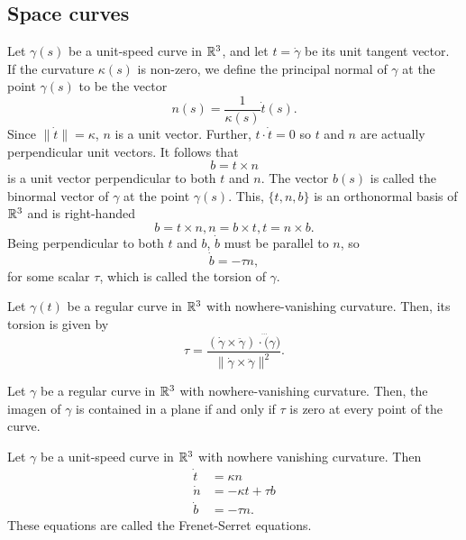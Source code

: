 \subsection{Space curves}

Let $\gamma(s)$ be a unit-speed curve in $\mathbb{R}^3$, and let
$t = \dot{\gamma}$ be its unit tangent vector.
If the curvature $\kappa(s)$ is non-zero, we define the principal normal of $\gamma$
at the point $\gamma(s)$ to be the vector
\[
  n(s) = \frac{1}{\kappa(s)} \dot{t}(s).
\]
Since $\|\dot{t}\| = \kappa$, $n$ is a unit vector.
Further, $t \cdot \dot{t} = 0$ so $t$ and $n$ are actually perpendicular unit vectors.
It follows that
\[
  b = t \times n  
\]
is a unit vector perpendicular to both $t$ and $n$.
The vector $b(s)$ is called the binormal vector of $\gamma$ at the point $\gamma(s)$.
This, $\{t, n, b\}$ is an orthonormal basis of $\mathbb{R}^3$ and is right-handed
\[
  b = t \times n, n = b \times t, t = n \times b.  
\]
Being perpendicular to both $t$ and $b$, $\dot{b}$ must be parallel to $n$, so
\[
  \dot{b} = -\tau n,
\]
for some scalar $\tau$, which is called the torsion of $\gamma$.

\begin{proposition}
  Let $\gamma(t)$ be a regular curve in $\mathbb{R}^3$ with nowhere-vanishing curvature.
  Then, its torsion is given by
  \[
    \tau = \frac{
      (\dot{\gamma} \times \ddot{\gamma}) \cdot \dddot(\gamma)
    }{
      \|\dot{\gamma} \times \ddot{\gamma}\|^2
    }.
  \]
\end{proposition}


\begin{proposition}
  Let $\gamma$ be a regular curve in $\mathbb{R}^3$ with nowhere-vanishing curvature.
  Then, the imagen of $\gamma$ is contained in a plane if and only if $\tau$ is zero at every point of the curve.
\end{proposition}

\begin{theorem}
  Let $\gamma$ be a unit-speed curve in $\mathbb{R}^3$ with nowhere vanishing curvature. Then
  \begin{align*}
    \dot{t} &= \kappa n \\
    \dot{n} &= -\kappa t + \tau b \\
    \dot{b} &= - \tau n.
  \end{align*}
  These equations are called the Frenet-Serret equations.
\end{theorem}

